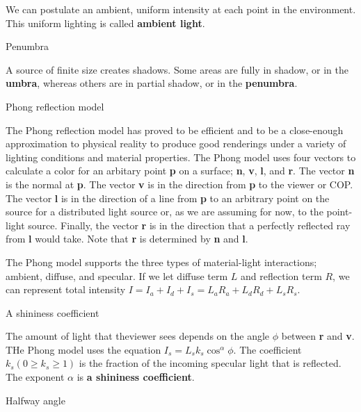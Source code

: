 \documentclass[10pt,a4paper]{article}
\begin{document}
\begin{enumerate}
			We can postulate an ambient, uniform intensity at each point in the environment. This uniform lighting is called \textbf{ambient light}.\\
			
		{\large \item Penumbra}
			
			A source of finite size creates shadows. Some areas are fully in shadow, or in the \textbf{umbra}, whereas others are in partial shadow, or in the \textbf{penumbra}.\\
			
		{\large \item Phong reflection model}
				
			The Phong reflection model has proved to be efficient and to be a close-enough approximation to physical reality to produce good renderings under a variety of lighting conditions and material properties. The Phong model uses four vectors to calculate a color for an arbitary point \textbf{p} on a surface; \textbf{n}, \textbf{v}, \textbf{l}, and \textbf{r}. The vector \textbf{n} is the normal at \textbf{p}. The vector \textbf{v} is in the direction from \textbf{p} to the viewer or COP. The vector \textbf{l} is in the direction of a line from \textbf{p} to an arbitrary point on the source for a distributed light source or, as we are assuming for now, to the point-light source. Finally, the vector \textbf{r} is in the direction that a perfectly reflected ray from \textbf{l} would take. Note that \textbf{r} is determined by \textbf{n} and \textbf{l}.
			
			The Phong model supports the three types of material-light interactions; ambient, diffuse, and specular. If we let diffuse term $ L $ and reflection term $ R $, we can represent total intensity $ I = I_a + I_d + I_s = L_a R_a + L_d R_d + L_s R_s $.\\
		
		\pagebreak
		
		{\large \item A shininess coefficient}
				
			The amount of light that theviewer sees depends on the angle $ \phi $ between \textbf{r} and \textbf{v}. THe Phong model uses the equation $I_s = L_s k_s \cos ^ \alpha \phi $. The coefficient $ k_s (0 \ge k_s \ge 1) $ is the fraction of the incoming specular light that is reflected. The exponent $ \alpha $ is \textbf{a shininess coefficient}.\\
			
		{\large \item Halfway angle}
				

\end{enumerate}
\end{document}
